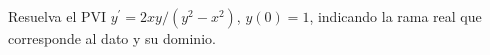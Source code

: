 Resuelva el PVI $y^{\prime}=2xy/(y^2-x^2)$, $y(0)=1$, indicando la rama real que corresponde al dato y su dominio.
